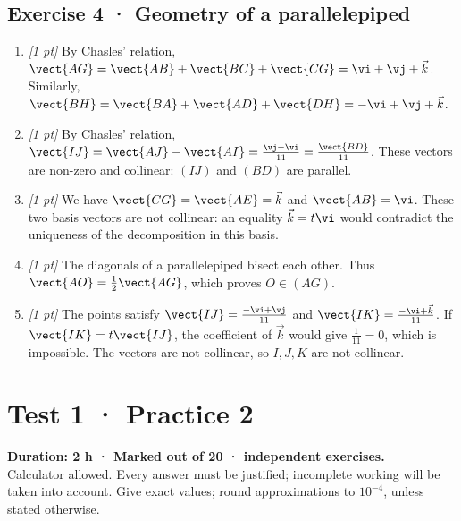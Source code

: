 \subsection*{Exercise 4 · Geometry of a parallelepiped}\begin{enumerate}

\item \textit{[1 pt]} By Chasles' relation, $\vect{AG}=\vect{AB}+\vect{BC}+\vect{CG}=\vi +\vj +\vec k$. Similarly, $\vect{BH}=\vect{BA}+\vect{AD}+\vect{DH}=-\vi +\vj +\vec k$.

\item \textit{[1 pt]} By Chasles' relation, $\vect{IJ}=\vect{AJ}-\vect{AI}=\frac{\vj -\vi }{11}=\frac{\vect{BD}}{11}$. These vectors are non-zero and collinear: $(IJ)$ and $(BD)$ are parallel.

\item \textit{[1 pt]} We have $\vect{CG}=\vect{AE}=\vec k$ and $\vect{AB}=\vi $. These two basis vectors are not collinear: an equality $\vec k=t\vi $ would contradict the uniqueness of the decomposition in this basis.

\item \textit{[1 pt]} The diagonals of a parallelepiped bisect each other. Thus $\vect{AO}=\frac12\vect{AG}$, which proves $O\in(AG)$.

\item \textit{[1 pt]} The points satisfy $\vect{IJ}=\frac{-\vi +\vj }{11}$ and $\vect{IK}=\frac{-\vi +\vec k}{11}$. If $\vect{IK}=t\vect{IJ}$, the coefficient of $\vec k$ would give $\frac{1}{11}=0$, which is impossible. The vectors are not collinear, so $I,J,K$ are not collinear.

\end{enumerate}

\fi

\mxnewpage{}\label{sujet:1-2}

\section*{Test 1 · Practice 2}


\textbf{Duration: 2 h · Marked out of 20 ·  independent exercises.}\\Calculator allowed. Every answer must be justified; incomplete working will be taken into account. Give exact values; round approximations to $10^{-4}$, unless stated otherwise.

